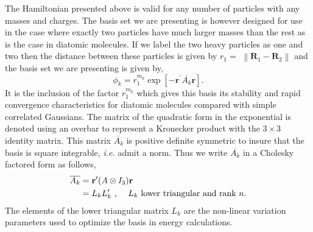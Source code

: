 \documentclass[12pt]{article}
\begin{document}
The Hamiltonian presented above is valid for any number of particles with any
masses and charges. The basis set we are presenting is however designed for
use in the case where exactly two particles have much larger masses than the
rest as is the case in diatomic molecules. If we label the two heavy particles
as one and two then the distance between these particles is given by $r_{1}=$
$\left\|  \mathbf{R}_{1}-\mathbf{R}_{2}\right\|  $ and the basis set we are
presenting is given by,
\begin{equation}
\phi_{k}=r_{1}^{m_{k}}\exp\left[  -\mathbf{r}^{\prime}\overline{A_{k}%
}\mathbf{r}\right]  .\label{basis1}%
\end{equation}
It is the inclusion of the factor $r_{1}^{m_{k}}$ which gives this basis its
stability and rapid convergence characteristics for diatomic molecules
compared with simple correlated Gaussians. The matrix of the quadratic form in
the exponential is denoted using an overbar to represent a Kronecker product
with the $3\times3$ identity matrix. This matrix $\overline{A_{k}}$ is
positive definite symmetric to insure that the basis is square integrable,
\textit{i.e.} admit a norm. Thus we write $\overline{A_{k}}$ in a Cholesky
factored form as follows,\qquad%
\begin{align}
\overline{A_{k}}  & =\mathbf{r}^{\prime}(A\otimes I_{3})\mathbf{r}\\
& =L_{k}L_{k}^{\prime}\text{ ,\thinspace\thinspace\thinspace\thinspace
\thinspace\thinspace\thinspace\thinspace}L_{k}\text{ lower triangular and rank
}n.\nonumber
\end{align}
The elements of the lower triangular matrix $L_{k}$ are the non-linear
variation parameters used to optimize the basis in energy calculations.
\end{document}
